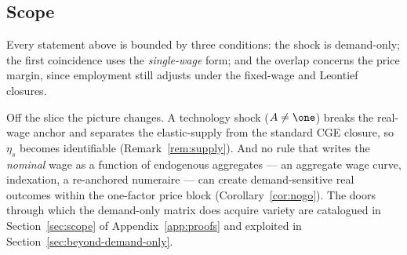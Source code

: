\subsection{Scope}\label{app:eqscope}

Every statement above is bounded by three conditions: the shock is
demand-only; the first coincidence uses the \emph{single-wage} form; and the
overlap concerns the price margin, since employment still adjusts under the
fixed-wage and Leontief closures.

Off the slice the picture changes. A technology shock ($A\neq\one$) breaks
the real-wage anchor and separates the elastic-supply from the standard CGE
closure, so $\eta_s$ becomes identifiable (Remark~\ref{rem:supply}). And no
rule that writes the \emph{nominal} wage as a function of endogenous
aggregates --- an aggregate wage curve, indexation, a re-anchored numeraire
--- can create demand-sensitive real outcomes within the one-factor price
block (Corollary~\ref{cor:nogo}). The doors through which the demand-only
matrix does acquire variety are catalogued in Section~\ref{sec:scope} of
Appendix~\ref{app:proofs} and exploited in
Section~\ref{sec:beyond-demand-only}.
